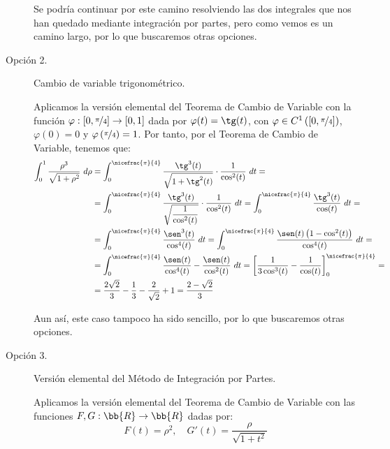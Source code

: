 \begin{ejercicio}
\begin{description}
        Se podría continuar por este camino resolviendo las dos integrales que nos han quedado mediante integración por partes,
        pero como vemos es un camino largo, por lo que buscaremos otras opciones.

        \item [Opción 2.] Cambio de variable trigonométrico.
        
        Aplicamos la versión elemental del Teorema de Cambio de Variable con la función $\varphi:\left[0,\nicefrac{\pi}{4}\right]\to [0,1]$ dada por $\varphi(t)=\tg(t)$, con $\varphi\in C^1\left([0,\nicefrac{\pi}{4}]\right)$, $\varphi(0)=0$ y $\varphi\left(\nicefrac{\pi}{4}\right)=1$. Por tanto, por el Teorema de Cambio de Variable, tenemos que:
        \begin{align*}
            \int_0^1 \dfrac{\rho^3}{\sqrt{1+\rho^2}} ~d\rho &= \int_0^{\nicefrac{\pi}{4}} \dfrac{\tg^3(t)}{\sqrt{1+\tg^2(t)}}\cdot \dfrac{1}{\cos^2(t)}~dt =\\
            &= \int_0^{\nicefrac{\pi}{4}} \dfrac{\tg^3(t)}{\sqrt{\dfrac{1}{\cos^2(t)}}}\cdot \dfrac{1}{\cos^2(t)}~dt
            = \int_0^{\nicefrac{\pi}{4}} \dfrac{\tg^3(t)}{\cos(t)}~dt =\\
            &= \int_0^{\nicefrac{\pi}{4}} \dfrac{\sen^3(t)}{\cos^4(t)}~dt
            = \int_0^{\nicefrac{\pi}{4}} \dfrac{\sen(t)\left(1-\cos^2(t)\right)}{\cos^4(t)}~dt =\\
            &= \int_0^{\nicefrac{\pi}{4}} \dfrac{\sen(t)}{\cos^4(t)} - \dfrac{\sen(t)}{\cos^2(t)}~dt
            = \left[\dfrac{1}{3\cos^3(t)} - \dfrac{1}{\cos(t)}\right]_0^{\nicefrac{\pi}{4}} = \\
            &= \dfrac{2\sqrt{2}}{3} - \dfrac{1}{3} -\dfrac{2}{\sqrt{2}} +1
            = \dfrac{2-\sqrt{2}}{3}
        \end{align*}

        Aun así, este caso tampoco ha sido sencillo, por lo que buscaremos otras opciones.
        
        \item [Opción 3.] Versión elemental del Método de Integración por Partes.
        
        Aplicamos la versión elemental del Teorema de Cambio de Variable con las funciones $F,G:\bb{R}\to \bb{R}$ dadas por:
        \begin{equation*}
            F(t) = \rho^2, \quad G'(t) = \dfrac{\rho}{\sqrt{1+t^2}}
        \end{equation*}


\end{description}
\end{ejercicio}
